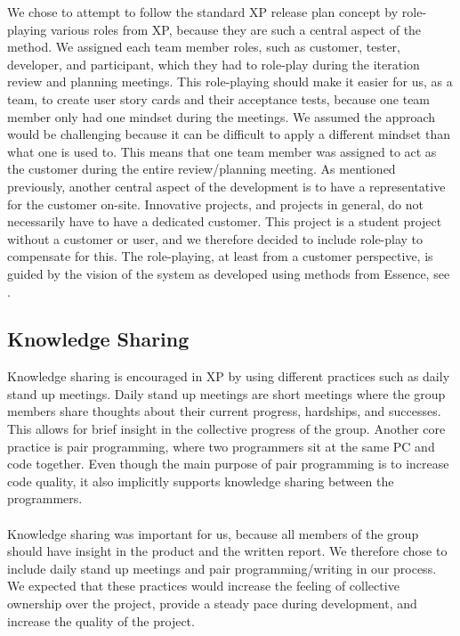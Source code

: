 We chose to attempt to follow the standard XP release plan concept by role-playing various roles from XP, because they are such a central aspect of the method. We assigned each team member roles, such as customer, tester, developer, and participant, which they had to role-play during the iteration review and planning meetings. This role-playing should make it easier for us, as a team, to create user story cards and their acceptance tests, because one team member only had one mindset during the meetings. We assumed the approach would be challenging because it can be difficult to apply a different mindset than what one is used to. This means that one team member was assigned to act as the customer during the entire review/planning meeting. As mentioned previously, another central aspect of the development is to have a representative for the customer on-site. Innovative projects, and projects in general, do not necessarily have to have a dedicated customer. This project is a student project without a customer or user, and we therefore decided to include role-play to compensate for this. The role-playing, at least from a customer perspective, is guided by the vision of the system as developed using methods from Essence, see .

\subsection{Knowledge Sharing}
\label{sub:knowledge_sharing}
Knowledge sharing is encouraged in XP by using different practices such as daily stand up meetings. Daily stand up meetings are short meetings where the group members share thoughts about their current progress, hardships, and successes. This allows for brief insight in the collective progress of the group. Another core practice is pair programming, where two programmers sit at the same PC and code together. Even though the main purpose of pair programming is to increase code quality, it also implicitly supports knowledge sharing between the programmers. 
\\\\ 
Knowledge sharing was important for us, because all members of the group should have insight in the product and the written report. We therefore chose to include daily stand up meetings and pair programming/writing in our process. We expected that these practices would increase the feeling of collective ownership over the project, provide a steady pace during development, and increase the quality of the project. 

